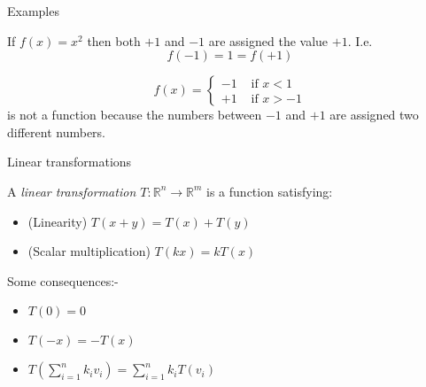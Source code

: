 \documentclass{beamer}
\begin{document}
\begin{frame}{Examples}
\begin{example}
If $f(x) = x^2$ then both $+1$ and $-1$ are assigned the value $+1$. I.e.
\begin{equation*}
f(-1) = 1 = f(+1)
\end{equation*}
\end{example}
\begin{example}
\begin{equation*}
f(x) = \begin{cases}
	-1 & \text{ if }x<1\\
	+1 & \text{ if }x>-1
\end{cases}
\end{equation*}
is not a function because the numbers between $-1$ and $+1$ are assigned two different numbers.
\end{example}
\end{frame}

\begin{frame}{Linear transformations}
\begin{definition}
A \emph{linear transformation $T:\mathbb{R}^n \rightarrow \mathbb{R}^m$} is a function satisfying:
\begin{itemize}
	\item (Linearity) $T(x+y) = T(x) + T(y)$
	\item (Scalar multiplication) $T(kx) = kT(x)$
\end{itemize}
\end{definition}
Some consequences:-
\begin{itemize}
	\item $T(0) = 0$
	\item $T(-x) = -T(x)$
	\item $T\left(\sum_{i=1}^n k_i v_i\right) = \sum_{i=1}^n k_i T(v_i)$
\end{itemize}
\end{frame}
\end{document}

